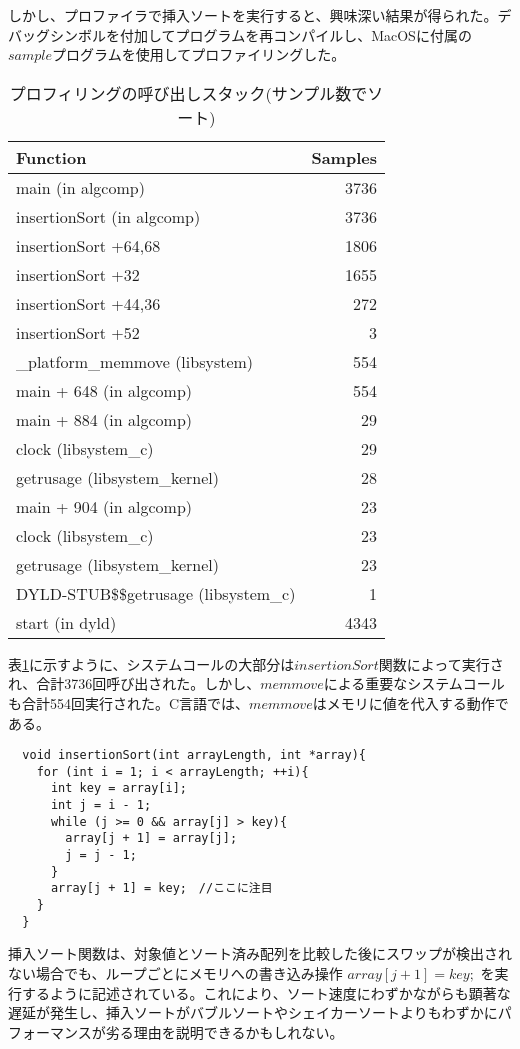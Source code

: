 \documentclass[a4j, 11pt]{jarticle}
\begin{document}
しかし、プロファイラで挿入ソートを実行すると、興味深い結果が得られた。デバッグシンボルを付加してプログラムを再コンパイルし、MacOSに付属の$sample$プログラムを使用してプロファイリングした。
\begin{table}[H]
  \centering
  \caption{プロフィリングの呼び出しスタック(サンプル数でソート)}\label{tab:call_stack_samples}
  \begin{tabular}{|l|r|}
    \hline
    \textbf{Function} & \textbf{Samples} \\
    \hline
    main (in algcomp)                 & 3736 \\
    insertionSort (in algcomp)       & 3736 \\
    \quad insertionSort +64,68       & 1806 \\
    \quad insertionSort +32          & 1655 \\
    \quad insertionSort +44,36       & 272  \\
    \quad insertionSort +52          & 3    \\
    \_platform\_memmove (libsystem)  & 554  \\
    main + 648 (in algcomp)          & 554  \\
    main + 884 (in algcomp)          & 29   \\
    clock (libsystem\_c)             & 29   \\
    getrusage (libsystem\_kernel)    & 28   \\
    main + 904 (in algcomp)          & 23   \\
    clock (libsystem\_c)             & 23   \\
    getrusage (libsystem\_kernel)    & 23   \\
    DYLD-STUB\$\$getrusage (libsystem\_c) & 1 \\
    start (in dyld)                  & 4343 \\
    \hline
  \end{tabular}
\end{table}
表\ref{tab:call_stack_samples}に示すように、システムコールの大部分は$insertionSort$関数によって実行され、合計3736回呼び出された。しかし、$memmove$による重要なシステムコールも合計554回実行された。C言語では、$memmove$はメモリに値を代入する動作である。
\begin{verbatim}
  void insertionSort(int arrayLength, int *array){
    for (int i = 1; i < arrayLength; ++i){
      int key = array[i];
      int j = i - 1;
      while (j >= 0 && array[j] > key){
        array[j + 1] = array[j];
        j = j - 1;
      }
      array[j + 1] = key;　//ここに注目
    }
  }
\end{verbatim}
挿入ソート関数は、対象値とソート済み配列を比較した後にスワップが検出されない場合でも、ループごとにメモリへの書き込み操作 $array[j + 1] = key;$ を実行するように記述されている。これにより、ソート速度にわずかながらも顕著な遅延が発生し、挿入ソートがバブルソートやシェイカーソートよりもわずかにパフォーマンスが劣る理由を説明できるかもしれない。\
\end{document}
